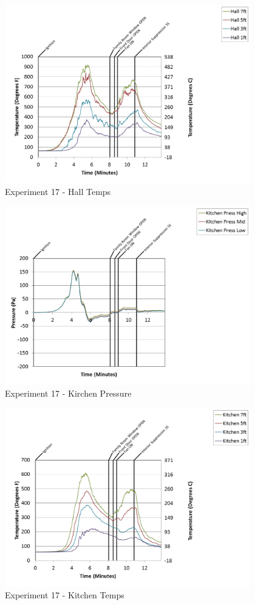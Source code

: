 \documentclass{article}
\begin{document}
\begin{appendices}
\clearpage

\begin{figure}[h!]
	\centering
	\includegraphics[height=3.05in]{0_Images/Results_Charts/Exp_17_Charts/HallTemps.png}
	\caption{Experiment 17 - Hall Temps}
\end{figure}


\begin{figure}[h!]
	\centering
	\includegraphics[height=3.05in]{0_Images/Results_Charts/Exp_17_Charts/KirchenPressure.png}
	\caption{Experiment 17 - Kirchen Pressure}
\end{figure}

\clearpage

\begin{figure}[h!]
	\centering
	\includegraphics[height=3.05in]{0_Images/Results_Charts/Exp_17_Charts/KitchenTemps.png}
	\caption{Experiment 17 - Kitchen Temps}
\end{figure}



\end{appendices}
\end{document}
